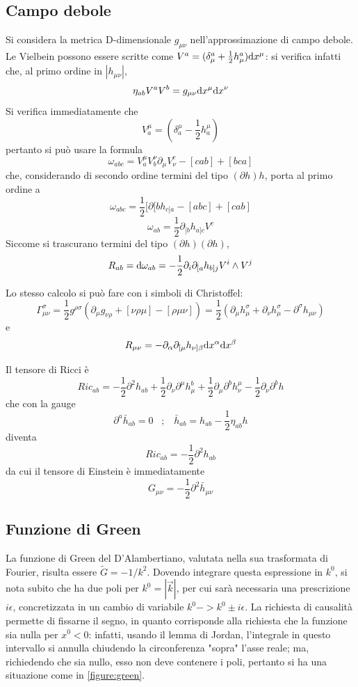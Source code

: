 \subsection{Campo debole}
Si considera la metrica D-dimensionale $g_{\mu\nu}$ nell'approssimazione di campo debole.
Le Vielbein possono essere scritte come \( V^a = (\delta^a_\mu + \frac{1}{2} h^a_\mu) \mathrm{d} x^\mu \): si verifica infatti che, al primo ordine in $|h_{\mu\nu}|$, 
\[ \eta_{ab} V^aV^b = g_{\mu\nu}\mathrm{d} x^\mu \mathrm{d} x^\nu \]
Si verifica immediatamente che 
\[ V^\mu_a = (\delta^\mu_a - \frac{1}{2} h^\mu_a) \]
pertanto si pu\`o usare la formula
\[ \omega_{abc} = V^\mu_a V^\nu_b \partial_\mu V^c_\nu - [cab] + [bca] \]
che, considerando di secondo ordine termini del tipo $(\partial h)h$,  \todo porta al primo ordine a 
\[ \omega_{abc} = \frac{1}{2} [ \partial{[b} h_{c]a} - [abc] + [cab] \]
\[ \omega_{ab} = \frac{1}{2} \partial_{[b} h_{a]c} V^c \]
Siccome si trascurano termini del tipo $(\partial h)(\partial h)$,
\[ R_{ab} = \mathrm{d} \omega_{ab} = -\frac{1}{2} \partial_i \partial_{[a} h_{b]j} V^i \wedge V^j \]

Lo stesso calcolo si pu\`o fare con i simboli di Christoffel:
\[ \Gamma ^\sigma_{\mu\nu} = \frac{1}{2} g^{\rho\sigma}(\partial_\mu g_{\nu\rho} + [\nu\rho\mu] - [\rho\mu\nu]) = \frac{1}{2}(\partial_\mu h^\sigma_\mu + \partial_\nu h^\sigma_\mu - \partial^\sigma h_{\mu\nu} ) \]
e
\[ R_{\mu\nu} = -\partial_{\alpha} \partial_{[\mu} h_{\nu]\beta} \mathrm{d} x^\alpha \mathrm{d} x^\beta \]

Il tensore di Ricci \`e
\[ Ric_{ab} = - \frac{1}{2} \partial^2  h_{ab} + \frac{1}{2} \partial_\nu \partial^\mu h^b_\mu 
              + \frac{1}{2} \partial_\mu \partial^b h^\mu_\nu - \frac{1}{2} \partial_\nu \partial^b h  \]
che con la gauge 
\[ \partial^a \bar{h}_{ab} = 0  \;\;\; ; \;\;\; \bar{h}_{ab} = h_{ab} - \frac{1}{2} \eta_{ab} h \]
diventa
\[ Ric_{ab} = - \frac{1}{2} \partial^2  h_{ab} \]
da cui il tensore di Einstein \`e immediatamente
\[ G_{\mu\nu} = -\frac{1}{2} \partial^2 \bar{h}_{\mu\nu} \]

\todo\todo



\subsection{Funzione di Green}
La funzione di Green del D'Alambertiano, valutata nella sua trasformata di Fourier, risulta essere \( \tilde{G} =- 1/k^2 \). Dovendo integrare questa espressione in $k^0$, si nota subito che ha due poli per \( k^0 = |\vec{k}| \), per cui sar\`a necessaria una prescrizione $i\epsilon$, concretizzata in un cambio di variabile \( k^0 -> k^0 \pm i\epsilon \). La richiesta di causalit\`a permette di fissarne il segno, in quanto corrisponde alla richiesta che la funzione sia nulla per \( x^0 < 0\):  infatti, usando il lemma di Jordan, l'integrale in questo intervallo si annulla chiudendo la circonferenza "sopra" l'asse reale; ma, richiedendo che sia nullo, esso non deve contenere i poli, pertanto si ha una situazione come in \ref{figure:green}.


